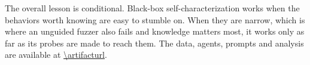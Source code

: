 The overall lesson is conditional. Black-box self-characterization works
when the behaviors worth knowing are easy to stumble on. When they are
narrow, which is where an unguided fuzzer also fails and knowledge matters
most, it works only as far as its probes are made to reach them. The data,
agents, prompts and analysis are available at \url{\artifacturl}.
